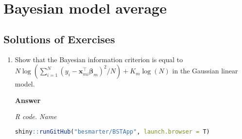 \chapter{Bayesian model average}\label{chap10}

\section{Solutions of Exercises}\label{sec101}
\begin{enumerate}[leftmargin=*]

	\item Show that the Bayesian information criterion is equal to $N\log(\sum_{i=1}^N(y_i-\bm{x}_{mi}^{\top}\bm{\beta}_m)^2/N)+K_m\log(N)$ in the Gaussian linear model. 
	
	\textbf{Answer}
	
	\begin{tcolorbox}[enhanced,width=4.67in,center upper,
		fontupper=\large\bfseries,drop shadow southwest,sharp corners]
		\textit{R code. Name}
		\begin{VF}
			\begin{lstlisting}[language=R]
	shiny::runGitHub("besmarter/BSTApp", launch.browser = T)
\end{lstlisting}
		\end{VF}
	\end{tcolorbox} 
	
\end{enumerate}